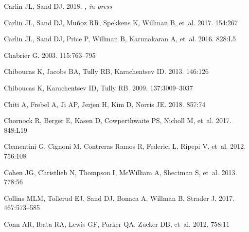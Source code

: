 \documentclass[a4paper]{ar-1col}
\begin{document}
\begin{thebibliography}{}
{Carlin} JL, {Sand} DJ. 2018.
\textit{\apj, in press}

{Carlin} JL, {Sand} DJ, {Mu{\~n}oz} RR, {Spekkens} K, {Willman} B, et~al. 2017.
\textit{\aj} 154:267

{Carlin} JL, {Sand} DJ, {Price} P, {Willman} B, {Karunakaran} A, et~al. 2016.
\textit{\apjl} 828:L5

{Chabrier} G. 2003.
\textit{\pasp} 115:763--795

{Chiboucas} K, {Jacobs} BA, {Tully} RB, {Karachentsev} ID. 2013.
\textit{\aj} 146:126

{Chiboucas} K, {Karachentsev} ID, {Tully} RB. 2009.
\textit{\aj} 137:3009--3037

{Chiti} A, {Frebel} A, {Ji} AP, {Jerjen} H, {Kim} D, {Norris} JE. 2018.
\textit{\apj} 857:74

{Chornock} R, {Berger} E, {Kasen} D, {Cowperthwaite} PS, {Nicholl} M, et~al.
  2017.
\textit{\apjl} 848:L19

{Clementini} G, {Cignoni} M, {Contreras Ramos} R, {Federici} L, {Ripepi} V,
  et~al. 2012.
\textit{\apj} 756:108

{Cohen} JG, {Christlieb} N, {Thompson} I, {McWilliam} A, {Shectman} S, et~al.
  2013.
\textit{\apj} 778:56

{Collins} MLM, {Tollerud} EJ, {Sand} DJ, {Bonaca} A, {Willman} B, {Strader} J.
  2017.
\textit{\mnras} 467:573--585

{Conn} AR, {Ibata} RA, {Lewis} GF, {Parker} QA, {Zucker} DB, et~al. 2012.
\textit{\apj} 758:11


\end{thebibliography}
\end{document}
